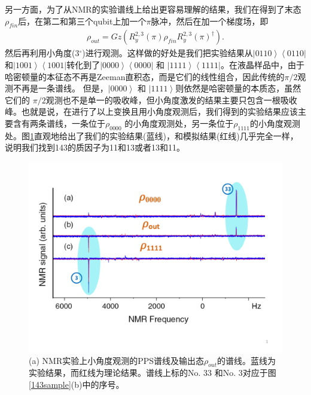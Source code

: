 另一方面，为了从NMR的实验谱线上给出更容易理解的结果，我们在得到了末态$\rho_{fin}$后，在第二和第三个qubit上加一个$\pi$脉冲，然后在加一个梯度场，即
\begin{eqnarray}
\rho_{out} = Gz(R_y^{2,3}(\pi)\rho_{fin}R_y^{2,3}(\pi)^{\dagger}).
\end{eqnarray}
然后再利用小角度(3$^{\circ}$)进行观测。这样做的好处是我们把实验结果从$\left\vert 0110
\right\rangle \left\langle 0110 \right\vert$和$\left\vert 1001
\right\rangle \left\langle 1001 \right\vert$转化到了$\left\vert 0000
\right\rangle \left\langle 0000 \right\vert$ 和 $\left\vert 1111
\right\rangle \left\langle 1111 \right\vert$。在液晶样品中，由于哈密顿量的本征态不再是Zeeman直积态，而是它们的线性组合，因此传统的$\pi/2$观测不再是一条谱线。
但是，$\left\vert 0000
\right\rangle$ 和 $\left\vert 1111
\right\rangle$则依然是哈密顿量的本质态，虽然它们的 $\pi/2$观测也不是单一的吸收峰，但小角度激发的结果主要只包含一根吸收峰。也就是说，在进行了以上变换且用小角度观测后，我们得到的实验结果应该主要含有两条谱线，一条位于$\rho_{0000}$
的小角度观测处，另一条位于$\rho_{1111}$的小角度观测处。图\ref{143result}直观地给出了我们的实验结果(蓝线)，和模拟结果(红线)几乎完全一样，说明我们找到143的质因子为11和13或者13和11。

\begin{figure}[htbp]
            \begin{center}
              \includegraphics[width= 0.8\columnwidth]{figures/143result.pdf}
              \caption{(a) NMR实验上小角度观测的PPS谱线及输出态$\rho_{out}$的谱线。蓝线为实验结果，而红线为理论结果。谱线上标的No. 33 和No. 3对应于图\ref{143sample}(b)中的序号。}
              \label{143result}
            \end{center}
\end{figure}

